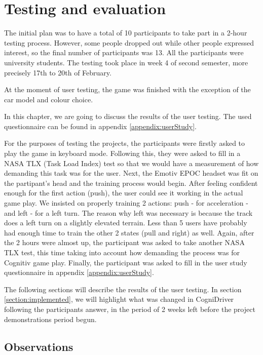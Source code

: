 \chapter{Testing and evaluation}
\label{cha:testing}

The initial plan was to have a total of 10 participants to take part in a 2-hour testing process. However, some people dropped out while other people expressed interest, so the final number of participants was 13. All the participants were university students. The testing took place in week 4 of second semester, more precisely 17th to 20th of February.

At the moment of user testing, the game was finished with the exception of the car model and colour choice.

In this chapter, we are going to discuss the results of the user testing. The used questionnaire can be found in appendix \ref{appendix:userStudy}. 

For the purposes of testing the projects, the participants were firstly asked to play the game in keyboard mode. Following this, they were asked to fill in a NASA TLX (Task Load Index) test so that we would have a measurement of how demanding this task was for the user. Next, the Emotiv EPOC headset was fit on the partipant's head and the training process would begin. After feeling confident enough for the first action (push), the user could see it working in the actual game play. We insisted on properly training 2 actions: push - for acceleration - and left - for a left turn. The reason why left was necessary is because the track does a left turn on a slightly elevated terrain. Less than 5 users have probably had enough time to train the other 2 states (pull and right) as well. Again, after the 2 hours were almost up, the participant was asked to take another NASA TLX test, this time taking into account how demanding the process was for Cognitiv game play. Finally, the participant was asked to fill in the user study questionnaire in appendix \ref{appendix:userStudy}. 

The following sections will describe the results of the user testing. In section \ref{section:implemented}, we will highlight what was changed in CogniDriver following the participants answer, in the period of 2 weeks left before the project demonstrations period begun.

\section{Observations}

